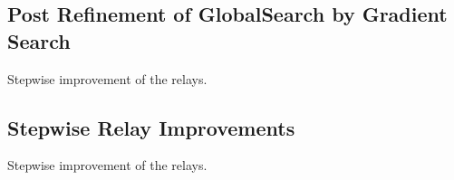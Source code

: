 \subsection{Post Refinement of GlobalSearch by Gradient Search}
Stepwise improvement of the relays.


\subsection{Stepwise Relay Improvements}
Stepwise improvement of the relays.







